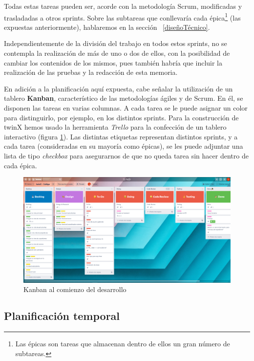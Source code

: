 Todas estas tareas pueden ser, acorde con la metodología Scrum, modificadas y trasladadas a otros sprints. Sobre las subtareas que conllevaría cada épica\footnote{Las épicas son tareas que almacenan dentro de ellos un gran número de subtareas.} (las expuestas anteriormente), hablaremos en la sección ~\ref{diseñoTécnico}. %

Independientemente de la división del trabajo en todos estos sprints, no se contempla la realización de más de uno o dos de ellos, con la posibilidad de cambiar los contenidos de los mismos, pues también habría que incluir la realización de las pruebas y la redacción de esta memoria.

En adición a la planificación aquí expuesta, cabe señalar la utilización de un tablero \textbf{Kanban}, característico de las metodologías ágiles y de Scrum. En él, se disponen las tareas en varias columnas. A cada tarea se le puede asignar un color para distinguirlo, por ejemplo, en los distintos sprints. Para la construcción de twinX hemos usado la herramienta \textit{Trello} para la confección de un tablero interactivo (figura \ref{fig:kanban}). Las distintas etiquetas representan distintos sprints, y a cada tarea (consideradas en su mayoría como épicas), se les puede adjuntar una lista de tipo \textit{checkbox} para asegurarnos de que no queda tarea sin hacer dentro de cada épica.

\begin{figure}
	\centering
	\includegraphics[width=\textwidth]{img/Capturas Kanban/kanban_codigo}
	\caption{Kanban al comienzo del desarrollo}
	\label{fig:kanban}
\end{figure}

\subsection{Planificación temporal}

